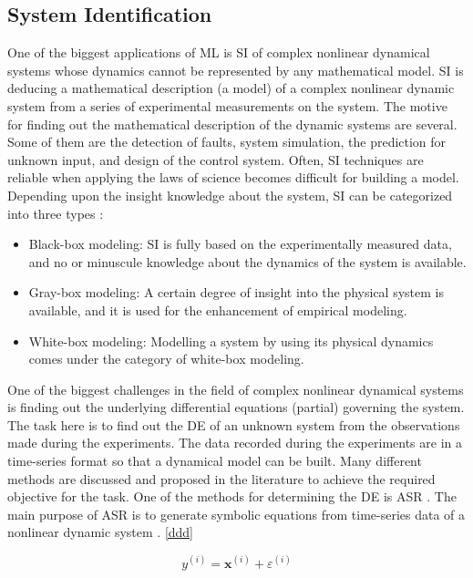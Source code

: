 \subsection{System Identification}

One of the biggest applications of \ac{ML} is \ac{SI} of complex nonlinear dynamical systems whose dynamics cannot be represented by any mathematical model. \ac{SI} is deducing a mathematical description (a model) of a complex nonlinear dynamic system from a series of experimental measurements on the system. The motive for finding out the mathematical description of the dynamic systems are several. Some of them are the detection of faults, system simulation, the prediction for unknown input, and design of the control system. Often, \ac{SI} techniques are reliable when applying the laws of science becomes difficult for building a model. Depending upon the insight knowledge about the system, SI can be categorized into three types \cite{ljung1999system}:

\begin{itemize}
	\item Black-box modeling: \ac{SI} is fully based on the experimentally measured data, and no or minuscule knowledge about the dynamics of the system is available.
	\item Gray-box modeling: A certain degree of insight into the physical system is available, and it is used for the enhancement of empirical modeling.
	\item White-box modeling: Modelling a system by using its physical dynamics comes under the category of white-box modeling.
\end{itemize}

One of the biggest challenges in the field of complex nonlinear dynamical systems is finding out the underlying differential equations (partial) governing the system. The task here is to find out the DE of an unknown system from the observations made during the experiments. The data recorded during the experiments are in a time-series format so that a dynamical model can be built. Many different methods are discussed and proposed in the literature to achieve the required objective for the task. One of the methods for determining the \ac{DE} is \ac{ASR} \cite{Bongard2007automated, schmidt2009Distilling}. The main purpose of \ac{ASR} is to generate symbolic equations from time-series data of a nonlinear dynamic system \cite{Bongard2007automated}. \autoref{ddd}

\begin{equation}
\label{ddd}
{{y}^{(i)}}={{\mathbf{x}}^{(i)}}+{{\varepsilon }^{(i)}}
\end{equation}

